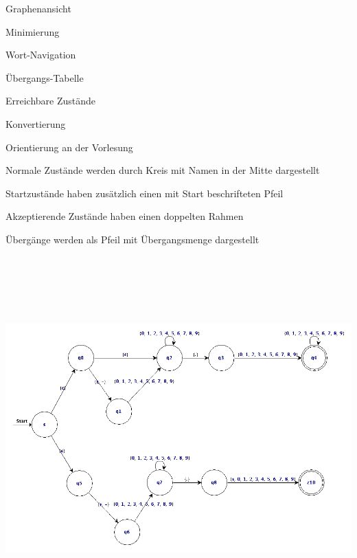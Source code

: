 



{
    \begin{itemgroup}{}
	\item Graphenansicht
	\item Minimierung
	\item Wort-Navigation
	\item Übergangs-Tabelle
	\item Erreichbare Zustände
	\item Konvertierung
	\end{itemgroup}

	\vfill{}
}


{
    \begin{itemgroup}{}
	\item Orientierung an der Vorlesung
	\item Normale Zustände werden durch Kreis mit Namen in der Mitte dargestellt
	\begin{itemgroup}{}
		\item Startzustände haben zusätzlich einen mit Start beschrifteten Pfeil
		\item Akzeptierende Zustände haben einen doppelten Rahmen
	\end{itemgroup}
	\item Übergänge werden als Pfeil mit Übergangsmenge dargestellt
	\end{itemgroup}

	\vfill{}
}


{
  \begin{center}
    \includegraphics[height=14cm]{../images/enfa_example.png}
  \end{center}
}


